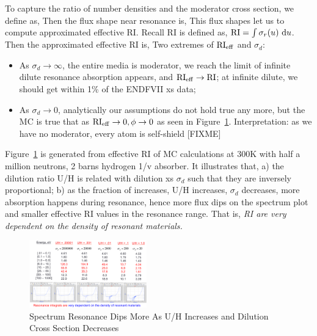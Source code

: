 \documentclass{school-22.211-notes}
\begin{document}
To capture the ratio of number densities and the moderator cross section, we define  as,
Then the flux shape near resonance is,
This flux shapes let us to compute approximated effective RI. Recall RI is defined as, $\mathrm{RI} = \int \sigma_r (u) \mbox{ }\mathrm{d} u$. Then the approximated effective RI is,
Two extremes of $\mathrm{RI}_{\mathrm{eff}}$ and $\sigma_d$:
\begin{itemize}
\item As $\sigma_d \to \infty$, the entire media is moderator, we reach the limit of infinite dilute resonance absorption appears, and $\mathrm{RI}_{\mathrm{eff}} \to \mathrm{RI}$; at infinite dilute, we should get within 1\% of the ENDFVII xs data;
\item As $\sigma_d \to 0$, analytically our assumptions do not hold true any more, but the MC is true that as $\mathrm{RI}_{\mathrm{eff}} \to 0, \phi \to 0$ as seen in Figure~\ref{dilution-factor-increase}. Interpretation: as we have no moderator, every atom is self-shield [FIXME]
\end{itemize}
Figure~\ref{dilution-factor-increase} is generated from effective RI of MC calculations at 300K with half a million neutrons, 2 barns hydrogen 1/v absorber. It illustrates that, a) the dilution ratio U/H is related with dilution xs $\sigma_d$ such that they are inversely proportional; b) as the fraction of  increases, U/H increases, $\sigma_d$ decreases, more absorption happens during resonance, hence more flux dips on the spectrum plot and smaller effective RI values in the resonance range. That is, \textit{RI are very dependent on the density of resonant materials.}
\begin{figure}
  \centering
  \includegraphics[width=2in]{images/dilution-factor-increase.png}
  \caption{Spectrum Resonance Dips More As U/H Increases and Dilution Cross Section Decreases} \label{dilution-factor-increase}
\end{figure}
\end{document}
